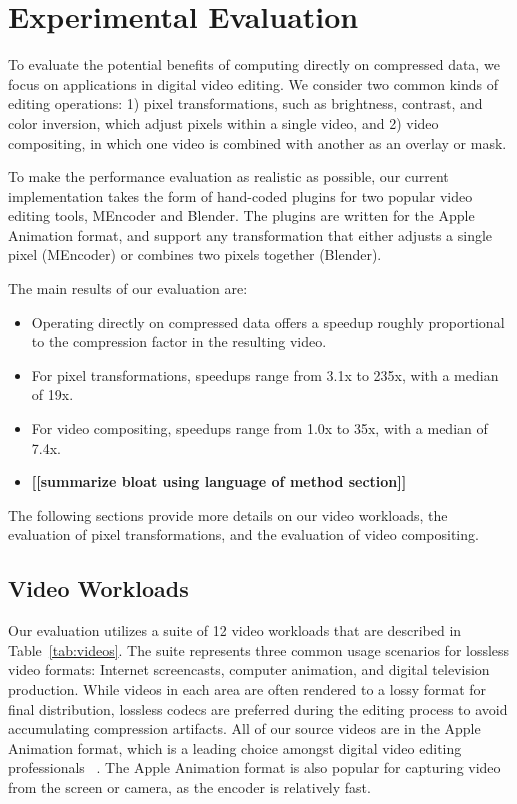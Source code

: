 \section{Experimental Evaluation}

To evaluate the potential benefits of computing directly on compressed
data, we focus on applications in digital video editing.  We consider
two common kinds of editing operations: 1) pixel transformations, such
as brightness, contrast, and color inversion, which adjust pixels
within a single video, and 2) video compositing, in which one video is
combined with another as an overlay or mask.

To make the performance evaluation as realistic as possible, our
current implementation takes the form of hand-coded plugins for two
popular video editing tools, MEncoder and Blender.  The plugins are
written for the Apple Animation format, and support any transformation
that either adjusts a single pixel (MEncoder) or combines two pixels
together (Blender).

The main results of our evaluation are:
\begin{itemize}

\item Operating directly on compressed data offers a speedup roughly
proportional to the compression factor in the resulting video.

\item For pixel transformations, speedups range from 3.1x to 235x,
with a median of 19x.

\item For video compositing, speedups range from 1.0x to 35x, with a
median of 7.4x.

\item {\bf [[summarize bloat using language of method section]]}

\end{itemize}
The following sections provide more details on our video workloads,
the evaluation of pixel transformations, and the evaluation of video
compositing.

\subsection{Video Workloads}

Our evaluation utilizes a suite of 12 video workloads that are
described in Table~\ref{tab:videos}.  The suite represents three
common usage scenarios for lossless video formats: Internet
screencasts, computer animation, and digital television production.
While videos in each area are often rendered to a lossy format for
final distribution, lossless codecs are preferred during the editing
process to avoid accumulating compression artifacts.  All of our
source videos are in the Apple Animation format, which is a leading
choice amongst digital video editing
professionals~\cite[p.~106]{adobe-anim} \cite[p.~284]{harrington-anim}
\cite[p.~367]{long-anim} \cite[p.~280]{pogue-anim}.  The Apple
Animation format is also popular for capturing video from the screen
or camera, as the encoder is relatively fast.

